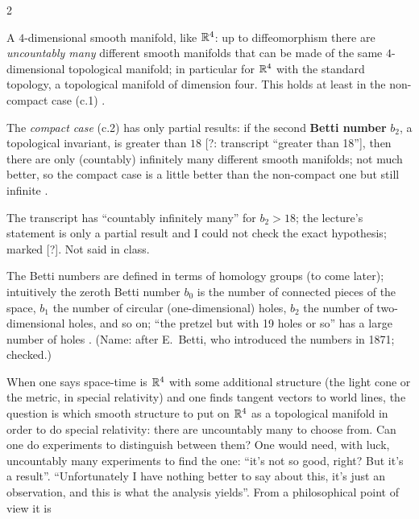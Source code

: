 \begin{paracol}{2}
\begin{theorem}\label{thm:df-four}
A $4$-dimensional smooth manifold, like $\mathbb{R}^4$: up to diffeomorphism there are \emph{uncountably many} different smooth manifolds that can be made of the same $4$-dimensional topological manifold; in particular for $\mathbb{R}^4$ with the standard topology, a topological manifold of dimension four.
This holds at least in the non-compact case (c.1)
.
\end{theorem}
The \emph{compact case} (c.2) has only partial results: if the second \textbf{Betti number} $b_2$, a topological invariant, is greater than $18$ [?: transcript ``greater than 18''], then there are only (countably) infinitely many different smooth manifolds; not much better, so the compact case is a little
better than the non-compact one but still infinite .
\begin{coursenote}
The transcript has ``countably infinitely many'' for $b_2>18$; the lecture's statement is only a partial result and I could not check the exact hypothesis; marked [?]. Not said in class.
\end{coursenote}
\begin{definition}\label{def:df-betti}
The Betti numbers are defined in terms of homology groups (to come later); intuitively the zeroth Betti number $b_0$ is the number of connected pieces of the space, $b_1$ the number of circular (one-dimensional) holes, $b_2$ the number of two-dimensional holes, and so on; ``the pretzel but with 19 holes or so'' has a large number of holes
. (Name: after E.~Betti, who introduced the numbers in 1871; checked.)
\end{definition}
\begin{application}\label{app:df-r4}
When one says space-time is $\mathbb{R}^4$ with some additional structure (the light cone or the metric, in special relativity) and one finds tangent vectors to world lines, the question is which smooth structure to put on $\mathbb{R}^4$ as a topological manifold in order to do special relativity: there are uncountably many to choose
from. Can one do experiments to distinguish between them? One would need, with luck, uncountably many experiments to find the one: ``it's not so good, right? But it's a result''. ``Unfortunately I have nothing better to say about this, it's just an observation, and this is what the analysis yields''. From a philosophical point of view it is

\end{application}
\end{paracol}
